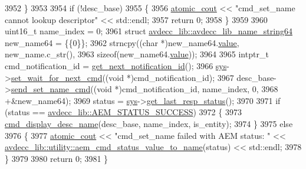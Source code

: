 \begin{DoxyCode}
3952     \}
3953 
3954     \textcolor{keywordflow}{if} (!desc\_base)
3955     \{
3956         \hyperlink{cmd__line_8h_a0bc38ccc65c79ba06c6fcd7b4bf554c3}{atomic\_cout} << \textcolor{stringliteral}{"cmd\_set\_name cannot lookup descriptor"} << std::endl;
3957         \textcolor{keywordflow}{return} 0;
3958     \}
3959 
3960     uint16\_t name\_index = 0;
3961     \textcolor{keyword}{struct }\hyperlink{structavdecc__lib_1_1avdecc__lib__name__string64}{avdecc\_lib::avdecc\_lib\_name\_string64} new\_name64 = \{\{0\}\};
3962     strncpy((\textcolor{keywordtype}{char} *)new\_name64.\hyperlink{structavdecc__lib_1_1avdecc__lib__name__string64_a7968db9d35aabae83b5c038723160e28}{value}, new\_name.c\_str(),
3963             \textcolor{keyword}{sizeof}(new\_name64.\hyperlink{structavdecc__lib_1_1avdecc__lib__name__string64_a7968db9d35aabae83b5c038723160e28}{value}));
3964 
3965     intptr\_t cmd\_notification\_id = \hyperlink{classcmd__line_a57486218387d1aa9d262eb7c176154ad}{get\_next\_notification\_id}();
3966     \hyperlink{classcmd__line_a485db4800e331cb4052c447fdf5d154e}{sys}->\hyperlink{classavdecc__lib_1_1system_a26b769584f10225077da47583edda33e}{set\_wait\_for\_next\_cmd}((\textcolor{keywordtype}{void} *)cmd\_notification\_id);
3967     desc\_base->\hyperlink{classavdecc__lib_1_1descriptor__base_a6a8c227d7a202f251c689107df7ede0b}{send\_set\_name\_cmd}((\textcolor{keywordtype}{void} *)cmd\_notification\_id, name\_index, 0,
3968                                  +&new\_name64);
3969     status = \hyperlink{classcmd__line_a485db4800e331cb4052c447fdf5d154e}{sys}->\hyperlink{classavdecc__lib_1_1system_aa63e8d1a4e51f695cdcccc9340922407}{get\_last\_resp\_status}();
3970 
3971     \textcolor{keywordflow}{if} (status == \hyperlink{namespaceavdecc__lib_affd436edb2cecd20cfd784a84f852b2bac947077909cb590b84f4b5db413080e0}{avdecc\_lib::AEM\_STATUS\_SUCCESS})
3972     \{
3973         \hyperlink{classcmd__line_a86dc6edfca6ae559b482840c706f7a1a}{cmd\_display\_desc\_name}(desc\_base, name\_index, is\_entity);
3974     \}
3975     \textcolor{keywordflow}{else}
3976     \{
3977         \hyperlink{cmd__line_8h_a0bc38ccc65c79ba06c6fcd7b4bf554c3}{atomic\_cout} << \textcolor{stringliteral}{"cmd\_set\_name failed with AEM status: "} << 
      \hyperlink{namespaceavdecc__lib_1_1utility_aca66a547b66fdb27f3221ad0844d60c6}{avdecc\_lib::utility::aem\_cmd\_status\_value\_to\_name}(status) 
      << std::endl;
3978     \}
3979 
3980     \textcolor{keywordflow}{return} 0;
3981 \}
\end{DoxyCode}


